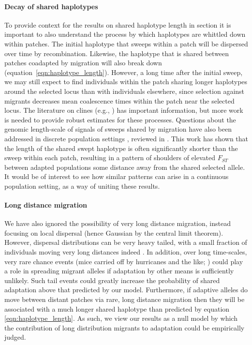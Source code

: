 \documentclass[10pt,letterpaper]{article}
\newcommand{\citep}[1]{\cite{#1}}
\newcommand{\citet}[1]{\cite{#1}}
\newcommand{\secref}[1]{{\emph{\nameref{#1}}}}
\begin{document}
\paragraph{Decay of shared haplotypes} 
To provide context for the results on shared haplotype length in
section \secref{ss:haplotype_length}
it is important to also understand
the process by which haplotypes are whittled down within patches.
The initial haplotype that sweeps within a patch 
will be dispersed over time by recombination.
Likewise, the haplotype that is shared between patches coadapted by migration
will also break down
(equation~\ref{eqn:haplotype_length}).
However, a long time after the initial sweep,
we may still expect to find individuals within the patch sharing longer haplotypes around the selected locus
than with individuals elsewhere,
since selection against migrants 
decreases mean coalescence times within the patch near the selected locus.  %
The literature on clines (e.g., \citet{barton1979geneflow}) has important information,
but more work is needed
to provide robust estimates for these processes.
Questions about the genomic length-scale of signals of
sweeps shared by migration have also been addressed in discrete
population settings \citep{slatkin1998hitchhiking,kim2011hitchhiking}, reviewed in \citet{barton2000genetic}. 
This work has shown that the length of the shared swept haplotype is often significantly
shorter than the sweep within each patch, resulting in a pattern of
shoulders of elevated $F_{ST}$ between adapted populations some distance away from
the shared selected allele. It would be of interest to see how similar
patterns can arise in a continuous population setting, as a way of
uniting these results.

\paragraph{Long distance migration}
We have also ignored the possibility of very long distance migration,
instead focusing on local dispersal (hence Gaussian by the central limit theorem).
However, dispersal distributions can be very heavy tailed, 
with a small fraction of individuals moving very long distances indeed \citep{levin2003ecology,reynolds2009levy}.
In addition, over long time-scales, very rare chance events (mice carried off by hurricanes and the like; \citet{censky1998overwater,nathan2008mechanisms})
could play a role in spreading migrant alleles if adaptation by other means is sufficiently unlikely.
Such tail events could greatly increase the probability of shared adaptation above that predicted by our model. 
Furthermore, if adaptive alleles do move between distant patches via rare, long distance migration 
then they will be associated with a much longer shared haplotype than predicted by equation \eqref{eqn:haplotype_length}. 
As such, we view our results as a null model by which the contribution of long distribution migrants to adaptation could be empirically judged.   
\end{document}
